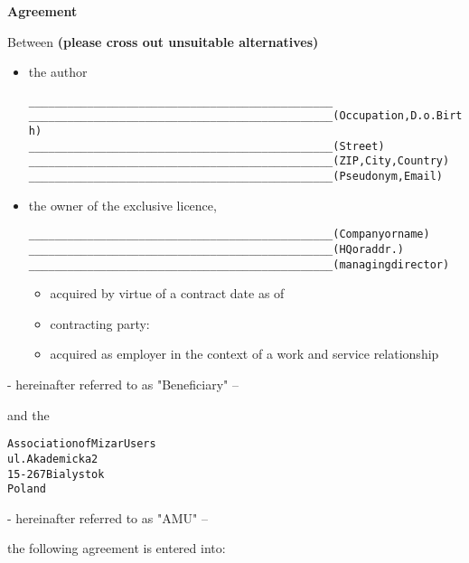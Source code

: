 \pagebreak
\begin{center}
{\Large\bf Agreement}
\end{center}
\vspace{-0.2cm}
Between 
{\bf (please cross out unsuitable alternatives)}\\
\vspace{-0.5cm}
\begin{itemize}
\item the author
\begin{alltt}
    _______________________________________________
    _______________________________________________ (Occupation, D.o. Birth)
    _______________________________________________ (Street)
    _______________________________________________ (ZIP, City, Country)
    _______________________________________________ (Pseudonym, Email)
\end{alltt}
\item the owner of the exclusive licence,
\begin{alltt}
    _______________________________________________ (Company or name)
    _______________________________________________ (HQ or addr.)
    _______________________________________________ (managing director)
\end{alltt}
\begin{itemize}
\item acquired by virtue of a contract date as of
\item contracting party:
\item acquired as employer in the context of a work and service
  relationship
\end{itemize}
\end{itemize}
\vspace{-0.5cm}
\begin{flushright}
- hereinafter referred to as "Beneficiary" --
\end{flushright}
\vspace{-0.5cm}
and the
\begin{alltt}
Association of Mizar Users
ul. Akademicka 2
15-267 Bialystok
Poland 
\end{alltt}
\begin{flushright}
\vspace{-0.5cm}
- hereinafter referred to as "AMU" --
\end{flushright}
the following agreement is entered into:\\
\vspace{-1cm}
